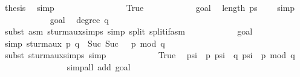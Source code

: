 \begin{isabellebody}
\ {\isacharquery}thesis\ \isamarkupfalse%
\ simp\isanewline
\ \ \ \ \ \ \isamarkupfalse%
\isanewline
\ \ \ \ \ \ \ \ \isamarkupfalse%
\ True\isanewline
\ \ \ \ \ \ \ \ \ \ \isamarkupfalse%
\ goal{}{\isacharparenleft}{}{\isacharparenright}\ \isamarkupfalse%
\ {\isachardoublequoteopen}length\ ps\ {\isasymge}\ {}{\isachardoublequoteclose}\ \isamarkupfalse%
\ simp\isanewline
\ \ \ \ \ \ \ \ \ \ \isamarkupfalse%
\ goal{}{\isacharparenleft}{}{\isacharparenright}\ \isamarkupfalse%
\ {\isachardoublequoteopen}degree\ q\ {\isasymnoteq}\ {}{\isachardoublequoteclose}\isanewline
\ \ \ \ \ \ \ \ \ \ \ \ \ \ \isamarkupfalse%
\ {\isacharparenleft}subst\ {\isacharparenleft}asm{\isacharparenright}\ sturm{\isacharunderscore}aux{\isachardot}simps{\isacharcomma}\ simp\ split{\isacharcolon}\ split{\isacharunderscore}if{\isacharunderscore}asm{\isacharparenright}\isanewline
\ \ \ \ \ \ \ \ \ \ \isamarkupfalse%
\ goal{}{\isacharparenleft}{}{\isacharparenright}\ \isamarkupfalse%
\ {\isacharbrackleft}simp{\isacharbrackright}{\isacharcolon}\ {\isachardoublequoteopen}sturm{\isacharunderscore}aux\ p\ q\ {\isacharbang}\ Suc\ {\isacharparenleft}Suc\ {}{\isacharparenright}\ {\isacharequal}\ {\isacharminus}{\isacharparenleft}p\ mod\ q{\isacharparenright}{\isachardoublequoteclose}\isanewline
\ \ \ \ \ \ \ \ \ \ \ \ \ \ \isamarkupfalse%
\ {\isacharparenleft}subst\ sturm{\isacharunderscore}aux{\isachardot}simps{\isacharcomma}\ simp{\isacharparenright}\isanewline
\ \ \ \ \ \ \ \ \ \ \isamarkupfalse%
\ True\ \isamarkupfalse%
\ {\isachardoublequoteopen}ps{\isacharbang}i\ {\isacharequal}\ p{\isachardoublequoteclose}\ {\isachardoublequoteopen}ps{\isacharbang}{\isacharparenleft}i{\isacharplus}{}{\isacharparenright}\ {\isacharequal}\ q{\isachardoublequoteclose}\ {\isachardoublequoteopen}ps{\isacharbang}{\isacharparenleft}i{\isacharplus}{}{\isacharparenright}\ {\isacharequal}\ {\isacharminus}{\isacharparenleft}p\ mod\ q{\isacharparenright}{\isachardoublequoteclose}\ \isanewline
\ \ \ \ \ \ \ \ \ \ \ \ \ \ \isamarkupfalse%
\ {\isacharparenleft}simp{\isacharunderscore}all\ add{\isacharcolon}\ goal{}{\isacharparenleft}{}{\isacharparenright}{\isacharparenright}\isanewline
\ \ \ \ \ \ \ \ \ \ \isamarkupfalse%

\end{isabellebody}

